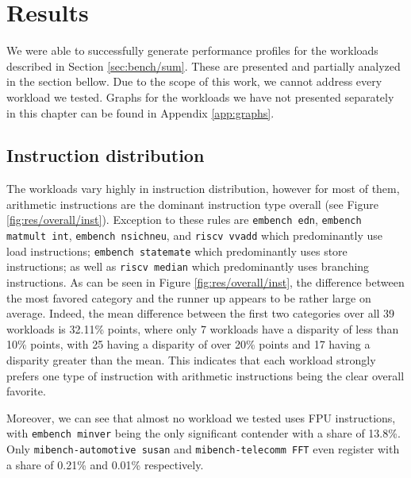 \documentclass[../bachelor_paper.tex]{subfiles}
\begin{document}
\chapter{Results}
    \label{ch:res}

We were able to successfully generate performance profiles for the workloads described in Section \ref{sec:bench/sum}. These are presented and partially analyzed in the section bellow. Due to the scope of this work, we cannot address every workload we tested. Graphs for the workloads we have not presented separately in this chapter can be found in Appendix \ref{app:graphs}.

\section{Instruction distribution}
The workloads vary highly in instruction distribution, however for most of them, arithmetic instructions are the dominant instruction type overall (see Figure \ref{fig:res/overall/inst}). Exception to these rules are \texttt{embench edn}, \texttt{embench matmult int}, \texttt{embench nsichneu}, and \texttt{riscv vvadd} which predominantly use load instructions; \texttt{embench statemate} which predominantly uses store instructions; as well as \texttt{riscv median} which predominantly uses branching instructions. As can be seen in Figure \ref{fig:res/overall/inst}, the difference between the most favored category and the runner up appears to be rather large on average. Indeed, the mean difference between the first two categories over all 39 workloads is 32.11\% points, where only 7 workloads have a disparity of less than 10\% points, with 25 having a disparity of over 20\% points and 17 having a disparity greater than the mean. This indicates that each workload strongly prefers one type of instruction with arithmetic instructions being the clear overall favorite. 

Moreover, we can see that almost no workload we tested uses FPU instructions, with \texttt{embench minver} being the only significant contender with a share of 13.8\%. Only \texttt{mibench-automotive susan} and \texttt{mibench-telecomm FFT} even register with a share of 0.21\% and 0.01\% respectively.
\end{document}
